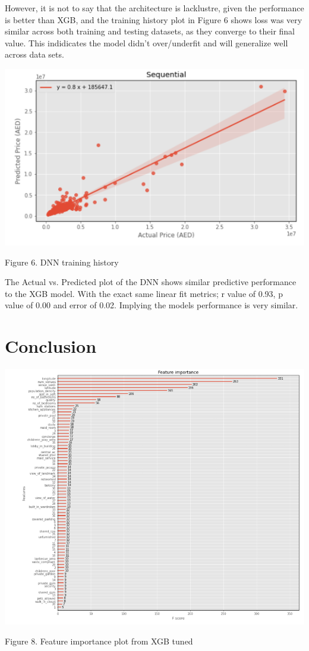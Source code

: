 \documentclass[conference]{IEEEtran}
\begin{document}
However, it is not to say that the architecture is lacklustre, given the performance is better than XGB, and the training history plot in Figure 6 shows loss was very similar across both training and testing datasets, as they converge to their final value. This indidicates the model didn't over/underfit and will generalize well across data sets.  


\smallbreak
\includegraphics[scale = 0.6]{images/dnn_ap.png}
\caption {Figure 6. DNN training history}
\smallbreak


The Actual vs. Predicted plot of the DNN shows similar predictive performance to the XGB model. With the exact same linear fit metrics; r value of 0.93, p value of 0.00 and error of 0.02. Implying the models performance is very similar. 


\section*{Conclusion}

\smallbreak
\smallbreak
\smallbreak
\includegraphics[scale = 0.33]{images/feat_impt.png}
\caption {Figure 8. Feature importance plot from XGB tuned}
\smallbreak
\smallbreak
\smallbreak
\end{document}
